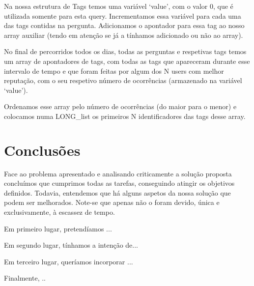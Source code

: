 \documentclass[a4paper]{report}
\begin{document}
Na nossa estrutura de Tags temos uma variável \textsf{‘value’}, com o valor 0,
que é utilizada somente para esta query. Incrementamos essa variável para cada
uma das tags contidas na pergunta. Adicionamos o apontador para essa tag ao nosso
array auxiliar (tendo em atenção se já a tínhamos adicionado ou não ao array).

No final de percorridos todos os dias, todas as perguntas e respetivas tags
temos um array de apontadores de tags, com todas as tags que apareceram durante
esse intervalo de tempo e que foram feitas por algum dos N users com melhor reputação,
com o seu respetivo número de ocorrências (armazenado na variável \textsf{‘value’}).

Ordenamos esse array pelo número de ocorrências (do maior para o menor) e
colocamos numa LONG\_list os primeiros N identificadores das tags desse array.


\chapter{Conclusões}
\label{ch:conclusao}

Face ao problema apresentado e analisando criticamente a solução proposta concluímos que cumprimos
todas as tarefas, conseguindo atingir os objetivos definidos. Todavia, entendemos que há alguns
aspetos da nossa solução que podem ser melhorados. Note-se que apenas não o foram devido, única
e exclusivamente, à escassez de tempo.

Em primeiro lugar, pretendíamos ...

Em segundo lugar, tínhamos a intenção de...

Em terceiro lugar, queríamos incorporar ...

Finalmente, ..
\end{document}

